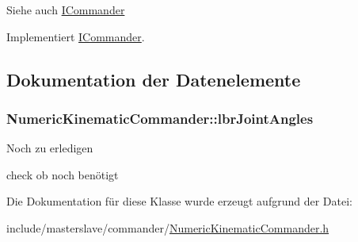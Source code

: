 \begin{DoxySeeAlso}{Siehe auch}
\hyperlink{classICommander}{I\-Commander} 
\end{DoxySeeAlso}


Implementiert \hyperlink{classICommander_abcacd07f49f646d08e1722a1df08b8ce}{I\-Commander}.



\subsection{Dokumentation der Datenelemente}
\hypertarget{classNumericKinematicCommander_af12b3f3e1d3058dd7cf93b923ab6f13b}{
\subsubsection[{lbr\-Joint\-Angles}]{\setlength{\rightskip}{0pt plus 5cm}Numeric\-Kinematic\-Commander\-::lbr\-Joint\-Angles\hspace{0.3cm}{\ttfamily [private]}}}\label{classNumericKinematicCommander_af12b3f3e1d3058dd7cf93b923ab6f13b}
\begin{DoxyRefDesc}{Noch zu erledigen}
\item[\hyperlink{todo__todo000007}{Noch zu erledigen}]check ob noch benötigt \end{DoxyRefDesc}


Die Dokumentation für diese Klasse wurde erzeugt aufgrund der Datei\-:\begin{DoxyCompactItemize}
\item 
include/masterslave/commander/\hyperlink{NumericKinematicCommander_8h}{Numeric\-Kinematic\-Commander.\-h}\end{DoxyCompactItemize}
